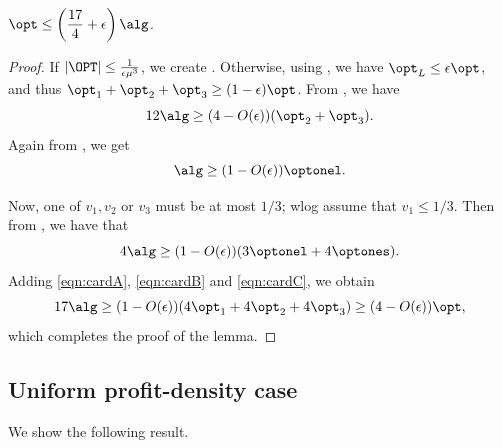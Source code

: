 \begin{lemma}
    $\displaystyle\opt \le \left(\frac{17}{4}+\epsilon\right)\alg$.
\end{lemma}
\begin{proof}
    If $|\OPT|\le \frac{1}{\epsilon\mu^3}$, we create . Otherwise, using , we have $\opt_L \le \epsilon\opt$, and thus $\opt_1+\opt_2+\opt_3 \ge (1-\epsilon)\opt$. From , we have 
    \begin{equation}
    \label{eqn:cardA}
        12\alg \ge (4-O(\epsilon))(\opt_2 + \opt_3).
    \end{equation}
     Again from , we get 
     \begin{equation}
     \label{eqn:cardB}
         \alg \ge (1-O(\epsilon))\optonel.
     \end{equation}

     Now, one of $v_1, v_2$ or $v_3$ must be at most $1/3$; wlog assume that $v_1 \le 1/3$. Then from , we have that
     \begin{equation}
     \label{eqn:cardC}
         4\alg \ge (1-O(\epsilon))(3\optonel + 4\optones).
     \end{equation}
    Adding \eqref{eqn:cardA}, \eqref{eqn:cardB} and \eqref{eqn:cardC}, we obtain 
    \[ 17\alg \ge (1-O(\epsilon))(4\opt_1+4\opt_2+4\opt_3)\ge (4-O(\epsilon))\opt,\]
    which completes the proof of the lemma.
\end{proof}







\subsection{Uniform profit-density case}
\label{sec:nonrot-prof-eq-vol}
We show the following result.

